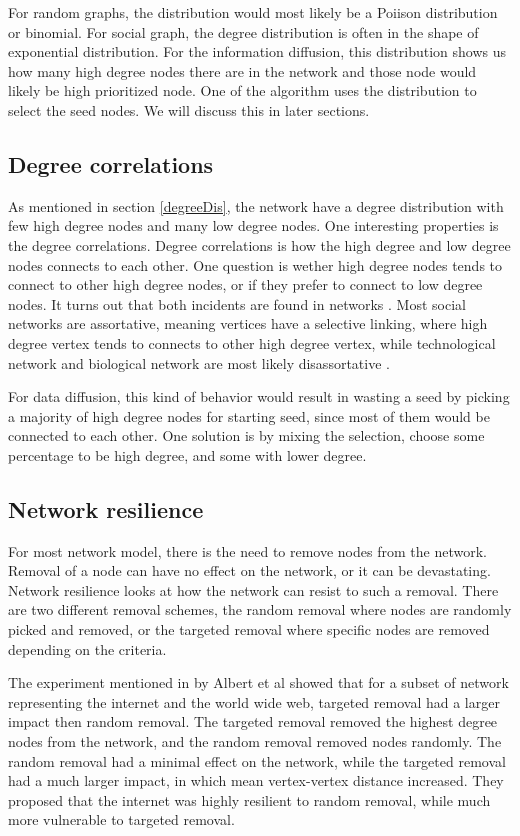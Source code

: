 For random graphs, the distribution would most likely be a Poiison distribution or binomial. For social graph, the degree distribution is often in the shape of exponential distribution. For the information diffusion, this distribution shows us how many high degree nodes there are in the network and those node would likely be high prioritized node. One of the algorithm uses the distribution to select the seed nodes. We will discuss this in later sections.  


\subsection{Degree correlations} \label{degreeCorr}
As mentioned in section \ref{degreeDis}, the network have a degree distribution with few high degree nodes and many low degree nodes. One interesting properties is the degree correlations. Degree correlations is how the high degree and low degree nodes connects to each other. One question is wether high degree nodes tends to connect to other high degree nodes, or if they prefer to connect to low degree nodes. It turns out that both incidents are found in networks \cite{ComplexNetwork2003}. Most social networks are assortative, meaning vertices have a selective linking, where high degree vertex tends to connects to other high degree vertex, while technological network and biological network are most likely disassortative \cite{AssortativeMixing2002}. 

For data diffusion, this kind of behavior would result in wasting a seed by picking a majority of high degree nodes for starting seed, since most of them would be connected to each other. One solution is by mixing the selection, choose some percentage to be high degree, and some with lower degree.

\subsection{Network resilience}
For most network model, there is the need to remove nodes from the network. Removal of a node can have no effect on the network, or it can be devastating. Network resilience looks at how the network can resist to such a removal. There are two different removal schemes, the random removal where nodes are randomly picked and removed, or the targeted removal where specific nodes are removed depending on the criteria. 

The experiment mentioned in  \cite{ComplexNetwork2003} by Albert et al showed that for a subset of network representing the internet and the world wide web, targeted removal had a larger impact then random removal. The targeted removal removed the highest degree nodes from the network, and the random removal removed nodes randomly. The random removal had a minimal effect on the network, while the targeted removal had a much larger impact, in which mean vertex-vertex distance increased. They proposed that the internet was highly resilient to random removal, while much more vulnerable to targeted removal. 

